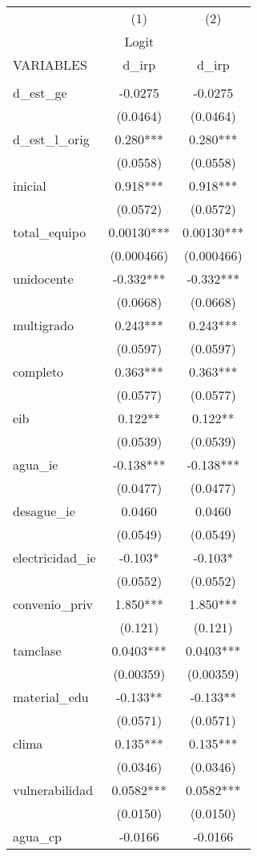 \documentclass[]{article}
\begin{document}
\begin{tabular}{lcc} \hline
 & (1) & (2) \\
 & Logit &  \\
VARIABLES & d\_irp & d\_irp \\ \hline
 &  &  \\
d\_est\_ge & -0.0275 & -0.0275 \\
 & (0.0464) & (0.0464) \\
d\_est\_l\_orig & 0.280*** & 0.280*** \\
 & (0.0558) & (0.0558) \\
inicial & 0.918*** & 0.918*** \\
 & (0.0572) & (0.0572) \\
total\_equipo & 0.00130*** & 0.00130*** \\
 & (0.000466) & (0.000466) \\
unidocente & -0.332*** & -0.332*** \\
 & (0.0668) & (0.0668) \\
multigrado & 0.243*** & 0.243*** \\
 & (0.0597) & (0.0597) \\
completo & 0.363*** & 0.363*** \\
 & (0.0577) & (0.0577) \\
eib & 0.122** & 0.122** \\
 & (0.0539) & (0.0539) \\
agua\_ie & -0.138*** & -0.138*** \\
 & (0.0477) & (0.0477) \\
desague\_ie & 0.0460 & 0.0460 \\
 & (0.0549) & (0.0549) \\
electricidad\_ie & -0.103* & -0.103* \\
 & (0.0552) & (0.0552) \\
convenio\_priv & 1.850*** & 1.850*** \\
 & (0.121) & (0.121) \\
tamclase & 0.0403*** & 0.0403*** \\
 & (0.00359) & (0.00359) \\
material\_edu & -0.133** & -0.133** \\
 & (0.0571) & (0.0571) \\
clima & 0.135*** & 0.135*** \\
 & (0.0346) & (0.0346) \\
vulnerabilidad & 0.0582*** & 0.0582*** \\
 & (0.0150) & (0.0150) \\
agua\_cp & -0.0166 & -0.0166 \\

\end{tabular}
\end{document}
